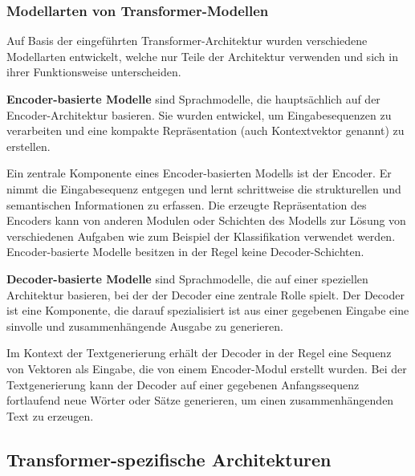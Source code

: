 \subsubsection{Modellarten von Transformer-Modellen}

Auf Basis der eingeführten Transformer-Architektur wurden verschiedene Modellarten entwickelt, welche nur Teile der Architektur verwenden und sich in ihrer Funktionsweise unterscheiden.

\begin{definition}\label{def:encoder-basierte-modelle}
    \textbf{Encoder-basierte Modelle} sind Sprachmodelle, die hauptsächlich auf der Encoder-Architektur basieren.
    Sie wurden entwickel, um Eingabesequenzen zu verarbeiten und eine kompakte Repräsentation (auch Kontextvektor genannt) zu erstellen.
\end{definition}
Ein zentrale Komponente eines Encoder-basierten Modells ist der Encoder.
Er nimmt die Eingabesequenz entgegen und lernt schrittweise die strukturellen und semantischen Informationen zu erfassen.
Die erzeugte Repräsentation des Encoders kann von anderen Modulen oder Schichten des Modells zur Lösung von verschiedenen Aufgaben 
wie zum Beispiel der Klassifikation verwendet werden.
Encoder-basierte Modelle besitzen in der Regel keine Decoder-Schichten.\\

\begin{definition}\label{def:decoder-basierte-modelle}
    \textbf{Decoder-basierte Modelle} sind Sprachmodelle, die auf einer speziellen Architektur basieren, bei der der Decoder eine zentrale Rolle spielt.
    Der Decoder ist eine Komponente, die darauf spezialisiert ist aus einer gegebenen Eingabe eine sinvolle und zusammenhängende Ausgabe zu generieren.
\end{definition}
Im Kontext der Textgenerierung erhält der Decoder in der Regel eine Sequenz von Vektoren als Eingabe, die von einem Encoder-Modul erstellt wurden.
Bei der Textgenerierung kann der Decoder auf einer gegebenen Anfangssequenz fortlaufend neue Wörter oder Sätze generieren, um einen zusammenhängenden Text zu erzeugen.

\subsection{Transformer-spezifische Architekturen}

